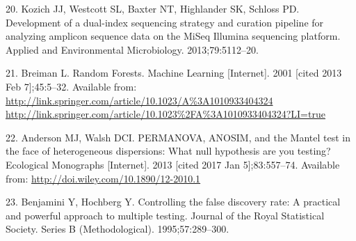\documentclass[12pt,]{article}
\begin{document}
\hypertarget{ref-kozich_development_2013}{}
20. Kozich JJ, Westcott SL, Baxter NT, Highlander SK, Schloss PD.
Development of a dual-index sequencing strategy and curation pipeline
for analyzing amplicon sequence data on the MiSeq Illumina sequencing
platform. Applied and Environmental Microbiology. 2013;79:5112--20.

\hypertarget{ref-breiman_random_2001}{}
21. Breiman L. Random Forests. Machine Learning {[}Internet{]}. 2001
{[}cited 2013 Feb 7{]};45:5--32. Available from:
\href{http://link.springer.com/article/10.1023/A\%3A1010933404324\%20http://link.springer.com/article/10.1023\%2FA\%3A1010933404324?LI=true}{http://link.springer.com/article/10.1023/A\%3A1010933404324 http://link.springer.com/article/10.1023\%2FA\%3A1010933404324?LI=true}

\hypertarget{ref-anderson_permanova_2013}{}
22. Anderson MJ, Walsh DCI. PERMANOVA, ANOSIM, and the Mantel test in
the face of heterogeneous dispersions: What null hypothesis are you
testing? Ecological Monographs {[}Internet{]}. 2013 {[}cited 2017 Jan
5{]};83:557--74. Available from:
\url{http://doi.wiley.com/10.1890/12-2010.1}

\hypertarget{ref-benjamini_controlling_1995}{}
23. Benjamini Y, Hochberg Y. Controlling the false discovery rate: A
practical and powerful approach to multiple testing. Journal of the
Royal Statistical Society. Series B (Methodological). 1995;57:289--300.
\end{document}
